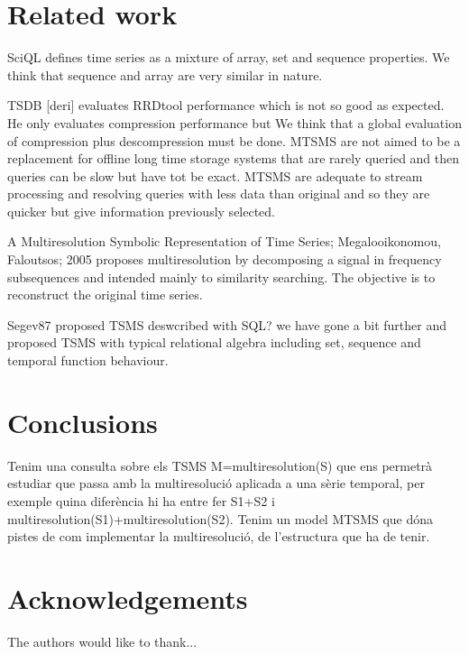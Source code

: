 

\section{Related work}




SciQL defines time series as a mixture of array, set and sequence properties. We think that sequence and array are very similar in nature. 



TSDB [deri] evaluates RRDtool performance which is not so good as expected. He only evaluates compression performance but We think that a global evaluation of compression plus descompression must be done. MTSMS are not aimed to be a replacement for offline long time storage systems that are rarely queried and then queries can be slow but have tot be exact. MTSMS are adequate to stream processing and resolving queries with less data than original and so they are quicker but give information previously selected.



A Multiresolution Symbolic Representation of
Time Series; Megalooikonomou, Faloutsos; 2005 proposes multiresolution by decomposing a signal in frequency subsequences and intended mainly to similarity searching. The objective is to reconstruct the original time series. 
 

Segev87 proposed TSMS deswcribed with SQL? we have gone a bit further and proposed TSMS with typical relational algebra including set, sequence and temporal function behaviour. 






\section{Conclusions}

Tenim una consulta sobre els TSMS M=multiresolution(S) que ens permetrà estudiar que passa amb la multiresolució aplicada a una sèrie temporal, per exemple quina diferència hi ha entre fer S1+S2 i multiresolution(S1)+multiresolution(S2).
Tenim un model MTSMS que dóna pistes de com implementar la multiresolució, de l'estructura que ha de tenir.



\section{Acknowledgements}


The authors would like to thank...









